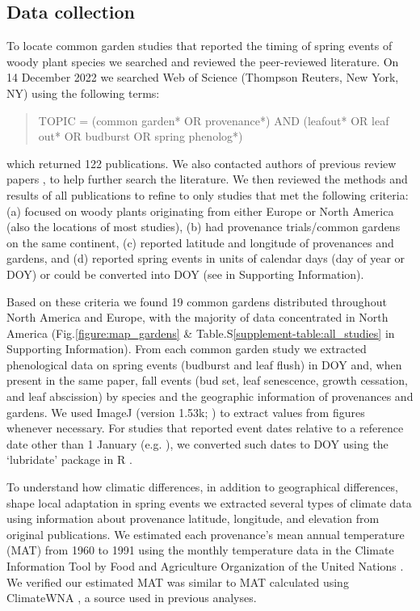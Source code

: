 \documentclass[12pt]{article}
\providecommand{\DIFaddtex}[1]{{\protect\color{blue}\uwave{#1}}} %
\providecommand{\DIFaddbegin}{} %
\providecommand{\DIFaddend}{} %
\providecommand{\DIFadd}[1]{\texorpdfstring{\DIFaddtex{#1}}{#1}} %
\newcommand{\DIFaddincludegraphics}[2][]{{\color{blue}\fbox{\DIFOincludegraphics[#1]{#2}}}} %
\DeclareRobustCommand{\DIFaddbegin}{\DIFOaddbegin \let\includegraphics\DIFaddincludegraphics} %
\DeclareRobustCommand{\DIFaddend}{\DIFOaddend \let\includegraphics\DIFOincludegraphics} %
\begin{document}
\subsection{Data collection}
To locate common garden studies that reported the timing of spring events of woody plant species we searched and reviewed the peer-reviewed literature. On 14 December 2022 we searched Web of Science (Thompson Reuters, New York, NY) using the following terms:
\begin{quote}
TOPIC = (common garden* OR provenance*) AND (leafout* OR leaf out* OR budburst OR spring phenolog*)
\end{quote}
which returned 122 publications. We also contacted authors of previous review papers \citep{AitkenBemmels16, Alberto13}, to help further search the literature. We then reviewed the methods and results of all publications to refine to only studies that met the following criteria: (a) focused on woody plants originating from either Europe or North America (also the locations of most studies), (b) had provenance trials/common gardens on the same continent, (c) reported latitude and longitude of provenances and gardens, and (d) reported spring events in units of calendar days (day of year or DOY) or could be converted into DOY (see  in Supporting Information).

Based on these criteria we found 19 common gardens distributed throughout North America and Europe, with the majority of data concentrated in \DIFaddbegin \DIFadd{western }\DIFaddend North America (Fig.\ref{figure:map_gardens} \& Table.S\ref{supplement-table:all_studies} in Supporting Information). From each common garden study we extracted phenological data on spring events (budburst and leaf flush) in DOY and, when present in the same paper, fall events (bud set, leaf senescence, growth cessation, and leaf abscission) by species and the geographic information of provenances and gardens. We used ImageJ (version 1.53k; \citealp{schneider_rasband_eliceiri_2012}) to extract values from figures whenever necessary. For studies that reported event dates relative to a reference date other than 1 January (e.g. \citealp{Rehfeldt1994}), we converted such dates to DOY using the `lubridate' package in R \citep{Grolemund11}. 

To understand how climatic differences, in addition to geographical differences, shape local adaptation in spring events we extracted several types of climate data using information about provenance latitude, longitude, and elevation from original publications. We estimated each provenance's mean annual temperature (MAT) from 1960 to 1991 using the monthly temperature data in the Climate Information Tool by Food and Agriculture Organization of the United Nations \citep{FAO2022}. We verified our estimated MAT was similar to MAT calculated using ClimateWNA \citep{wang2016}, a source used in previous analyses. 
\end{document}
